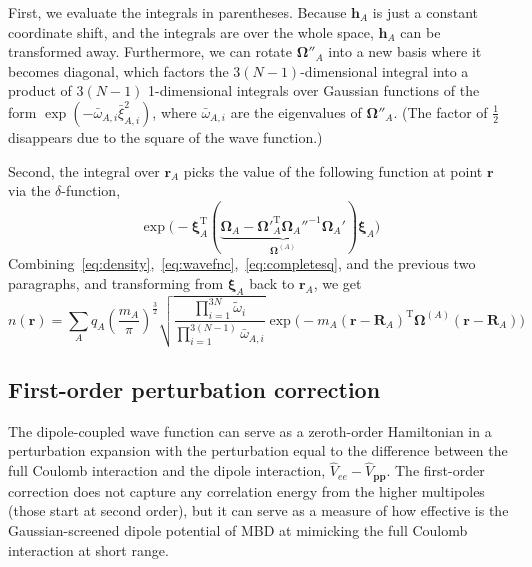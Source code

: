 First, we evaluate the integrals in parentheses.
Because $\mathbf h_A$ is just a constant coordinate shift, and the integrals are over the whole space, $\mathbf h_A$ can be transformed away.
Furthermore, we can rotate $\boldsymbol\Omega''_A$ into a new basis where it becomes diagonal, which factors the $3(N-1)$-dimensional integral into a product of $3(N-1)$ 1-dimensional integrals over Gaussian functions of the form $\exp(-\bar\omega_{A,i}\bar\xi_{A,i}^2)$, where $\bar\omega_{A,i}$ are the eigenvalues of $\boldsymbol\Omega''_A$.
(The factor of $\frac12$ disappears due to the square of the wave function.)

Second, the integral over $\mathbf r_A$ picks the value of the following function at point $\mathbf r$ via the $\delta$-function,
\begin{equation}
\exp\big(-\boldsymbol\xi_A^\mathrm T(\underbrace{\boldsymbol\Omega_A-{\boldsymbol\Omega'}^\mathrm T_A\boldsymbol\Omega_A''^{-1}\boldsymbol\Omega_A'}_{\boldsymbol\Omega^{(A)}})\boldsymbol\xi_A\big)
\end{equation}
Combining~\eqref{eq:density},~\eqref{eq:wavefnc},~\eqref{eq:completesq}, and the previous two paragraphs, and transforming from $\boldsymbol\xi_A$ back to $\mathbf r_A$, we get
\begin{equation}
n(\mathbf r)=\sum_A q_A\left(\frac{m_A}\pi\right)^\frac32\sqrt{\frac{\prod_{i=1}^{3N}\tilde\omega_i}{\prod_{i=1}^{3(N-1)}\bar\omega_{A,i}}}\exp\big(-m_A(\mathbf r-\mathbf R_A)^\mathrm T\boldsymbol\Omega^{(A)}(\mathbf r-\mathbf R_A)\big)
\label{eq:mbd-density}
\end{equation}

\subsection{First-order perturbation correction}

The dipole-coupled wave function can serve as a zeroth-order Hamiltonian in a perturbation expansion with the perturbation equal to the difference between the full Coulomb interaction and the dipole interaction, $\hat V_{ee}-\hat V_\mathbf{pp}$.
The first-order correction does not capture any correlation energy from the higher multipoles (those start at second order), but it can serve as a measure of how effective is the Gaussian-screened dipole potential of MBD at mimicking the full Coulomb interaction at short range.

